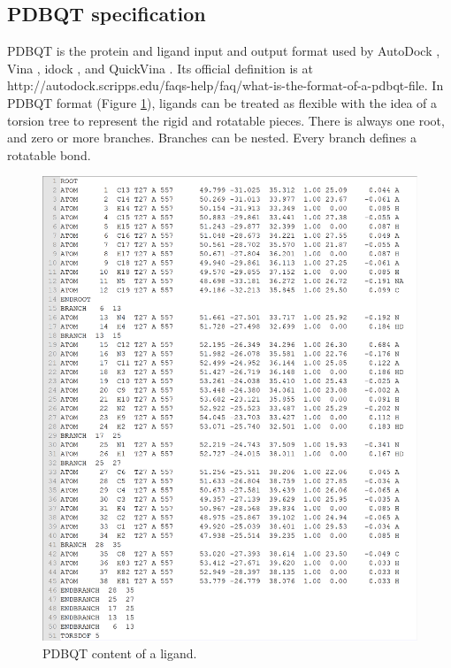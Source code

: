 \subsection{PDBQT specification}

PDBQT is the protein and ligand input and output format used by AutoDock \citep{597,596}, Vina \citep{595}, idock \citep{1153}, and QuickVina \citep{1193}. Its official definition is at http://autodock.scripps.edu/faqs-help/faq/what-is-the-format-of-a-pdbqt-file. In PDBQT format (Figure \ref{idock:PDBQT}), ligands can be treated as flexible with the idea of a torsion tree to represent the rigid and rotatable pieces. There is always one root, and zero or more branches. Branches can be nested. Every branch defines a rotatable bond.

\begin{figure}
\centering
\includegraphics[width=\linewidth]{../usrt/T27CrystalPDBQT.png}
\caption{PDBQT content of a ligand.}
\label{idock:PDBQT}
\end{figure}

